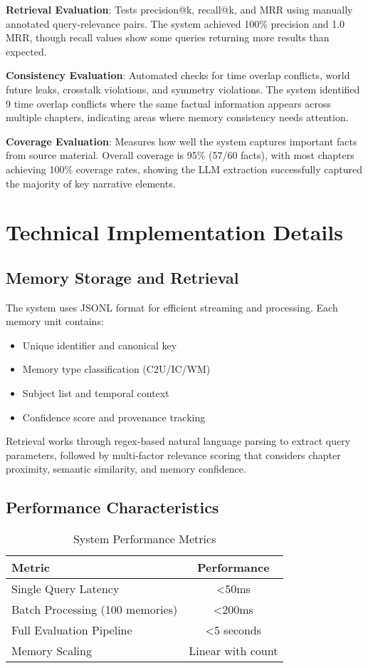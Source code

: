 \documentclass[11pt,a4paper]{article}
\begin{document}
\textbf{Retrieval Evaluation}: Tests precision@k, recall@k, and MRR using manually annotated query-relevance pairs. The system achieved 100\% precision and 1.0 MRR, though recall values show some queries returning more results than expected.

\textbf{Consistency Evaluation}: Automated checks for time overlap conflicts, world future leaks, crosstalk violations, and symmetry violations. The system identified 9 time overlap conflicts where the same factual information appears across multiple chapters, indicating areas where memory consistency needs attention.

\textbf{Coverage Evaluation}: Measures how well the system captures important facts from source material. Overall coverage is 95\% (57/60 facts), with most chapters achieving 100\% coverage rates, showing the LLM extraction successfully captured the majority of key narrative elements.

\section{Technical Implementation Details}

\subsection{Memory Storage and Retrieval}

The system uses JSONL format for efficient streaming and processing. Each memory unit contains:
\begin{itemize}
    \item Unique identifier and canonical key
    \item Memory type classification (C2U/IC/WM)
    \item Subject list and temporal context
    \item Confidence score and provenance tracking
\end{itemize}

Retrieval works through regex-based natural language parsing to extract query parameters, followed by multi-factor relevance scoring that considers chapter proximity, semantic similarity, and memory confidence.

\subsection{Performance Characteristics}

\begin{table}[h]
\centering
\begin{tabular}{lc}
\toprule
\textbf{Metric} & \textbf{Performance} \\
\midrule
Single Query Latency & <50ms \\
Batch Processing (100 memories) & <200ms \\
Full Evaluation Pipeline & <5 seconds \\
Memory Scaling & Linear with count \\
\bottomrule
\end{tabular}
\caption{System Performance Metrics}
\end{table}
\end{document}
